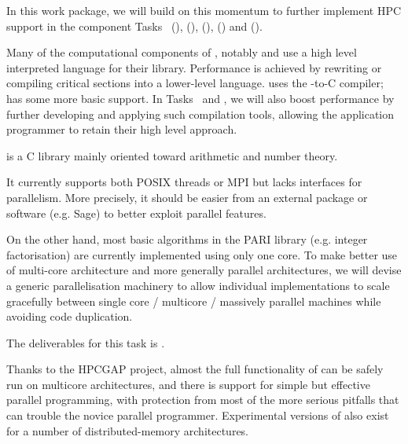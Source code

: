 \begin{workpackage}
\begin{wpdescription}
  In this work package, we will build on this momentum to further implement HPC support in
  the component Tasks~ (\Pari), (\GAP),
   (\Linbox), (\MPIR) and
   (\Singular).
  
  Many of the computational components of \TheProject, notably \Sage
  and \GAP use a high level
  interpreted language for their library. Performance is achieved by
  rewriting or compiling critical sections into a lower-level
  language. \Sage uses
  the \Cython \Python-to-C compiler; \GAP has some more basic support.
  In Tasks~ and , we will also boost performance by
  further developing and applying such compilation tools, allowing the
  application programmer to retain their high level approach.

\end{wpdescription}
\begin{tasklist}
\begin{task}[title=PARI,id=hpc-pari,PM=20, lead=UB,wphases=0-48!0.5,issue=99]
  \Pari is a C library mainly oriented toward arithmetic and number theory.
  
  It currently supports both POSIX threads or MPI but lacks interfaces for
  parallelism. More precisely, it should be easier from an external package
  or software (e.g. Sage) to better exploit \Pari parallel features.

  On the other hand, most basic algorithms in the PARI library (e.g. integer
  factorisation) are currently implemented using only one core. To
  make better use of multi-core architecture and more generally parallel
  architectures, we will devise a generic parallelisation machinery
  to allow individual implementations to scale gracefully between single
  core / multicore / massively parallel machines while avoiding code
  duplication.

  The deliverables for this task is .
\end{task}


\begin{task}[title=GAP,id=hpc-gap,PM=18, lead=SA, wphases={0-48!0.375}, issue=100]
  Thanks to the HPCGAP project, almost the full functionality of \GAP
  can be safely run on multicore architectures, and there is support for
  simple but effective parallel programming, with protection from most
  of the more serious pitfalls that can trouble the novice parallel
  programmer. Experimental versions of \GAP also exist for a number of
  distributed-memory architectures.



\end{task}
\end{tasklist}
\end{workpackage}
